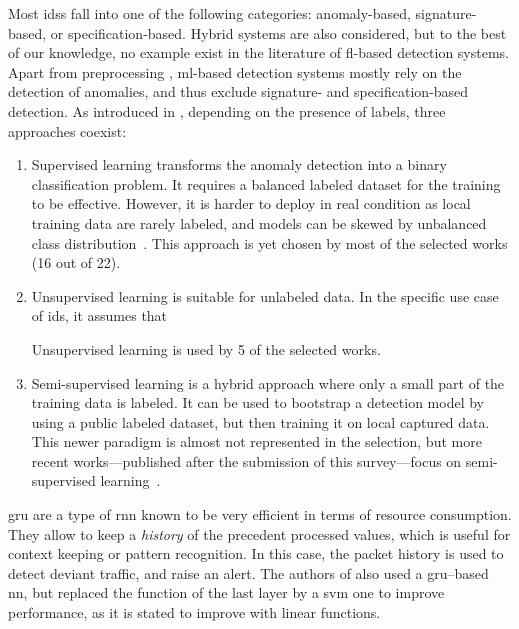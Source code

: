 

Most \glspl{ids} fall into one of the following categories: anomaly-based, signature-based, or specification-based.
Hybrid systems are also considered, but to the best of our knowledge, no example exist in the literature of \gls{fl}-based detection systems.
Apart from preprocessing \cite{Kruegel2003}, \gls{ml}-based detection systems mostly rely on the detection of anomalies, and thus exclude signature- and specification-based detection.
As introduced in , depending on the presence of labels, three approaches coexist:
\begin{enumerate}[(1)]
    \item Supervised learning transforms the anomaly detection into a binary classification problem.
It requires a balanced labeled dataset for the training to be effective.
However, it is harder to deploy in real condition as local training data are rarely labeled, and models can be skewed by unbalanced class distribution~\cite{Campos2021}.
This approach is yet chosen by most of the selected works (16 out of 22).
    \item Unsupervised learning is suitable for unlabeled data.
In the specific use case of \gls{ids}, it assumes that
    Unsupervised learning is used by 5 of the selected works.
    \item Semi-supervised learning is a hybrid approach where only a small part of the training data is labeled.
It can be used to bootstrap a detection model by using a public labeled dataset, but then training it on local captured data.
This newer paradigm is almost not represented in the selection, but more recent works---published after the submission of this survey---focus on semi-supervised learning~\cite{Zhu2022,Aouedi2022}.
\end{enumerate}

\gls{gru} are a type of \gls{rnn} known to be very efficient in terms of resource consumption.
They allow to keep a \emph{history} of the precedent processed values, which is useful for context keeping or pattern recognition.
In this case, the packet history is used to detect deviant traffic, and raise an alert.
The authors of \cite{chen_Networkanomalydetection_2020b} also used a \gls{gru}--based \gls{nn}, but replaced the  function of the last layer by a \gls{svm} one to improve performance, as it is stated to improve with linear functions.

